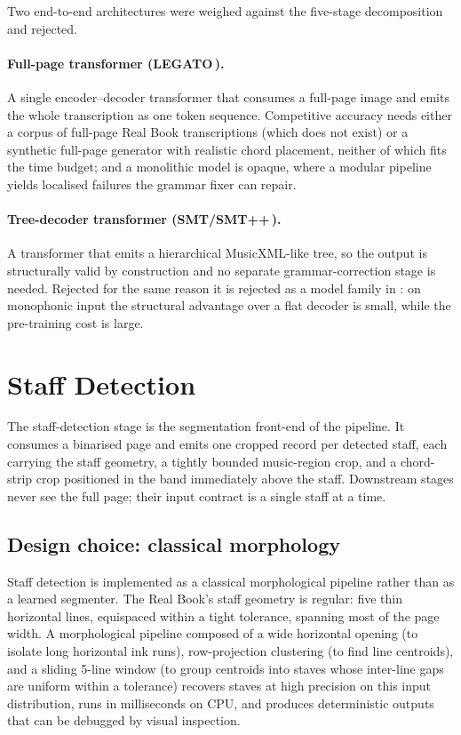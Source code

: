 Two end-to-end architectures were weighed against the five-stage
decomposition and rejected.

\paragraph{Full-page transformer (LEGATO\,\cite{yangLEGATO2025}).}
A single encoder--decoder transformer that consumes a full-page image
and emits the whole transcription as one token sequence.
Competitive accuracy needs either a corpus of full-page Real Book
transcriptions (which does not exist) or a synthetic full-page
generator with realistic chord placement, neither of which fits the
time budget; and a monolithic model is opaque, where a modular
pipeline yields localised failures the grammar fixer can repair.

\paragraph{Tree-decoder transformer (SMT/SMT++\,\cite{riosVilaSheetMusicTransformer2024,riosVilaSMTPlusPlus2024}).}
A transformer that emits a hierarchical MusicXML-like tree, so the
output is structurally valid by construction and no separate
grammar-correction stage is needed.
Rejected for the same reason it is rejected as a model family in
: on monophonic input the structural
advantage over a flat decoder is small, while the pre-training cost is
large.

\section{Staff Detection}
\label{sec:design-staffdetect}

The staff-detection stage is the segmentation front-end of the pipeline.
It consumes a binarised page and emits one cropped  record
per detected staff, each carrying the staff geometry, a tightly bounded
music-region crop, and a chord-strip crop positioned in the band
immediately above the staff.
Downstream stages never see the full page; their input contract is a
single staff at a time.

\subsection{Design choice: classical morphology}

Staff detection is implemented as a classical morphological pipeline
rather than as a learned segmenter.
The Real Book's staff geometry is regular: five thin horizontal lines,
equispaced within a tight tolerance, spanning most of the page width.
A morphological pipeline composed of a wide horizontal opening
(to isolate long horizontal ink runs), row-projection clustering
(to find line centroids), and a sliding 5-line window (to group
centroids into staves whose inter-line gaps are uniform within a
tolerance) recovers staves at high precision on this input
distribution, runs in milliseconds on CPU, and produces
deterministic outputs that can be debugged by visual inspection.

